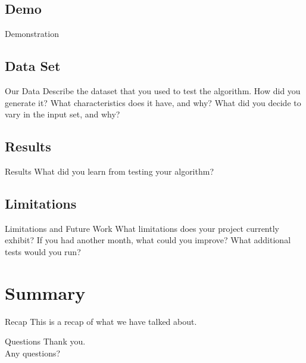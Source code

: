\documentclass{beamer}
\begin{document}
\subsection{Demo}
\begin{frame}{Demonstration}
\end{frame}

\subsection{Data Set}
\begin{frame}{Our Data}
    Describe the dataset that you used to test the algorithm. How did you
    generate it? What characteristics does it have, and why? What did you
    decide to vary in the input set, and why?
\end{frame}

\subsection{Results}
\begin{frame}{Results}
    What did you learn from testing your algorithm?
\end{frame}

\subsection{Limitations}
\begin{frame}{Limitations and Future Work}
    What limitations does your project currently exhibit? If you had another
    month, what could you improve? What additional tests would you run?
\end{frame}


\section{Summary}\frame{\sectionpage}
\begin{frame}{Recap}
    This is a recap of what we have talked about.
\end{frame}

\begin{frame}{Questions}
    Thank you.\\
    Any questions?
\end{frame}
\end{document}
